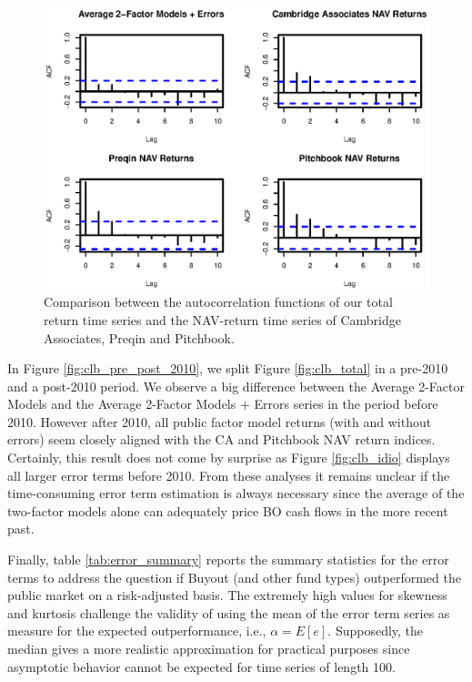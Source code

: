 \documentclass[12pt]{article}
\begin{document}
\begin{figure}[H]
	\centering
	\includegraphics{Figures/ACFunBO}
	\caption{
		Comparison between the autocorrelation functions of our total return time series and the NAV-return time series of Cambridge Associates, Preqin and Pitchbook.
	}
	\label{fig:autocorrelation}
\end{figure}

In Figure \ref{fig:clb_pre_post_2010}, we split Figure \ref{fig:clb_total} in a pre-2010 and a post-2010 period.
We observe a big difference between the Average 2-Factor Models and the Average 2-Factor Models + Errors series in the period before 2010.
However after 2010, all public factor model returns (with and without errors) seem closely aligned with the CA and Pitchbook NAV return indices.
Certainly, this result does not come by surprise as Figure \ref{fig:clb_idio} displays all larger error terms before 2010.
From these analyses it remains unclear if the time-consuming error term estimation is always necessary since the average of the two-factor models alone can adequately price BO cash flows in the more recent past.

Finally, table \ref{tab:error_summary} reports the summary statistics for the error terms to address the question if Buyout (and other fund types) outperformed the public market on a risk-adjusted basis.
The extremely high values for skewness and kurtosis challenge the validity of using the mean of the error term series as measure for the expected outperformance, i.e., $\alpha = E [ e ]$.
Supposedly, the median gives a more realistic approximation for practical purposes since asymptotic behavior cannot be expected for time series of length 100.
\end{document}
